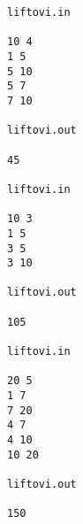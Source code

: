 \begin{verbatim}
liftovi.in 
 
10 4 
1 5 
5 10 
5 7 
7 10 
 
liftovi.out 
 
45 

liftovi.in 
 
10 3 
1 5 
3 5 
3 10 
 
liftovi.out 
 
105 

liftovi.in 
 
20 5 
1 7 
7 20 
4 7 
4 10 
10 20 
 
liftovi.out 
 
150 

\end{verbatim}